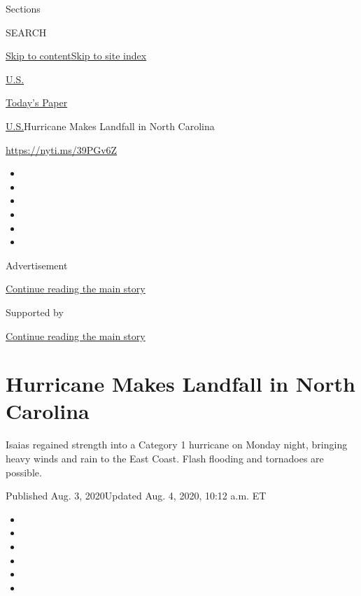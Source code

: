 Sections

SEARCH

\protect\hyperlink{site-content}{Skip to
content}\protect\hyperlink{site-index}{Skip to site index}

\href{https://www.nytimes3xbfgragh.onion/section/us}{U.S.}

\href{https://myaccount.nytimes3xbfgragh.onion/auth/login?response_type=cookie\&client_id=vi}{}

\href{https://www.nytimes3xbfgragh.onion/section/todayspaper}{Today's
Paper}

\href{/section/us}{U.S.}\textbar{}Hurricane Makes Landfall in North
Carolina

\url{https://nyti.ms/39PGv6Z}

\begin{itemize}
\item
\item
\item
\item
\item
\item
\end{itemize}

Advertisement

\protect\hyperlink{after-top}{Continue reading the main story}

Supported by

\protect\hyperlink{after-sponsor}{Continue reading the main story}

\hypertarget{hurricane-makes-landfall-in-north-carolina}{%
\section{Hurricane Makes Landfall in North
Carolina}\label{hurricane-makes-landfall-in-north-carolina}}

Isaias regained strength into a Category 1 hurricane on Monday night,
bringing heavy winds and rain to the East Coast. Flash flooding and
tornadoes are possible.

Published Aug. 3, 2020Updated Aug. 4, 2020, 10:12 a.m. ET

\begin{itemize}
\item
\item
\item
\item
\item
\item
\end{itemize}

